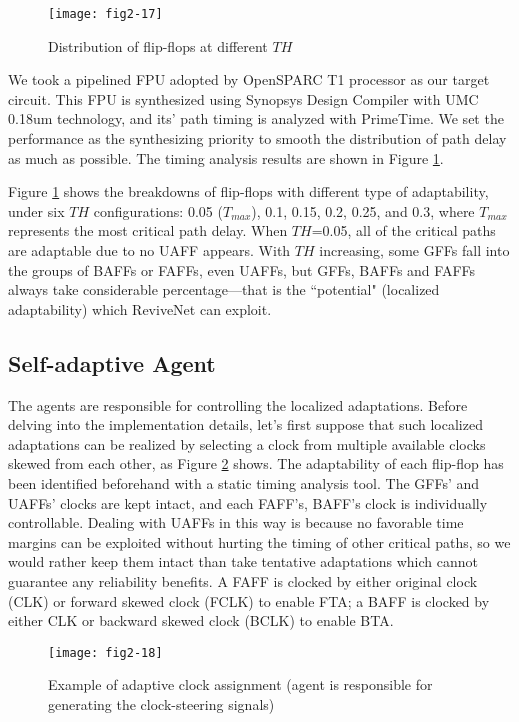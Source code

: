 \begin{figure}[t]
\centering
\texttt{[image: fig2-17]}
    \caption{Distribution of flip-flops at different $TH$}\label{ff_type}
\end{figure}

We took a pipelined FPU adopted by OpenSPARC T1 \cite{OpenSPARC_06} processor as our target circuit. This FPU is synthesized using Synopsys Design Compiler with UMC 0.18um technology, and its' path timing is analyzed with PrimeTime. We set the performance as the synthesizing priority to smooth the distribution of path delay as much as possible. The timing analysis results are shown in Figure \ref{ff_type}.

Figure \ref{ff_type} shows the breakdowns of flip-flops with different type of adaptability, under six $TH$ configurations: 0.05 ($T_{max}$), 0.1, 0.15, 0.2, 0.25, and 0.3, where $T_{max}$ represents the most critical path delay. When $TH$=0.05, all of the critical paths are adaptable due to no  UAFF appears. With $TH$ increasing, some GFFs fall into the groups of BAFFs or FAFFs, even UAFFs, but GFFs, BAFFs and FAFFs always take considerable percentage---that is the ``potential" (localized adaptability) which ReviveNet can exploit.

\subsection{Self-adaptive Agent} \label{agentdesign}
The agents are responsible for controlling the localized adaptations. Before delving into the implementation details, let's first suppose that such localized adaptations can be realized by selecting a clock from multiple available clocks skewed from each other, as Figure \ref{affs} shows. The adaptability of each flip-flop has been identified beforehand with a static timing analysis tool. The GFFs' and UAFFs' clocks are kept intact, and each FAFF's, BAFF's clock is individually controllable. Dealing with UAFFs in this way is because no favorable time margins can be exploited without hurting the timing of other critical paths, so we would rather keep them intact than take tentative adaptations which cannot guarantee any reliability benefits. A FAFF is clocked by either original clock (CLK) or forward skewed clock (FCLK) to enable FTA; a BAFF is clocked by either CLK or backward skewed clock (BCLK) to enable BTA.

\begin{figure}[t]
\centering
\texttt{[image: fig2-18]}
   \caption{Example of adaptive clock assignment (agent is responsible for
   generating the clock-steering signals)}\label{affs}
\end{figure}

